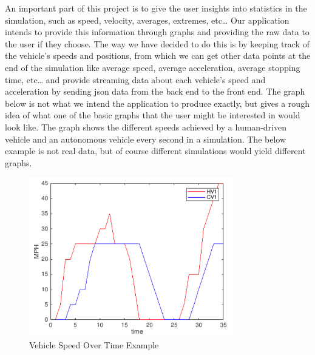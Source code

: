\documentclass[onecolumn, draftclsnofoot,10pt, compsoc]{IEEEtran}
\begin{document}
An important part of this project is to give the user insights into statistics in the simulation, such as speed, velocity, averages, extremes, etc… Our application intends to provide this information through graphs and providing the raw data to the user if they choose. The way we have decided to do this is by keeping track of the vehicle’s speeds and positions, from which we can get other data points at the end of the simulation like average speed, average acceleration, average stopping time, etc… and provide streaming data about each vehicle’s speed and acceleration by sending json data from the back end to the front end.
The graph below is not what we intend the application to produce exactly, but gives a rough idea of what one of the basic graphs that the user might be interested in would look like. The graph shows the different speeds achieved by a human-driven vehicle and an autonomous vehicle every second in a simulation. The below example is not real data, but of course different simulations would yield different graphs.
\begin{figure}[H]
\caption{Vehicle Speed Over Time Example}
\includegraphics[width=3.5in]{graph}
\end{figure}
\end{document}
